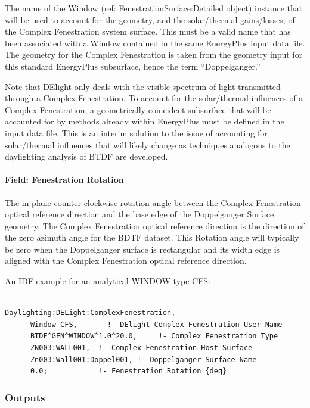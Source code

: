 The name of the Window (ref: FenestrationSurface:Detailed object) instance that will be used to account for the geometry, and the solar/thermal gains/losses, of the Complex Fenestration system surface. This must be a valid name that has been associated with a Window contained in the same EnergyPlus input data file. The geometry for the Complex Fenestration is taken from the geometry input for this standard EnergyPlus subsurface, hence the term ``Doppelganger.''

Note that DElight only deals with the visible spectrum of light transmitted through a Complex Fenestration. To account for the solar/thermal influences of a Complex Fenestration, a geometrically coincident subsurface that will be accounted for by methods already within EnergyPlus must be defined in the input data file. This is an interim solution to the issue of accounting for solar/thermal influences that will likely change as techniques analogous to the daylighting analysis of BTDF are developed.

\paragraph{Field: Fenestration Rotation}\label{field-fenestration-rotation}

The in-plane counter-clockwise rotation angle between the Complex Fenestration optical reference direction and the base edge of the Doppelganger Surface geometry. The Complex Fenestration optical reference direction is the direction of the zero azimuth angle for the BDTF dataset. This Rotation angle will typically be zero when the Doppelganger surface is rectangular and its width edge is aligned with the Complex Fenestration optical reference direction.

An IDF example for an analytical WINDOW type CFS:

\begin{lstlisting}

Daylighting:DELight:ComplexFenestration,
      Window CFS,       !- DElight Complex Fenestration User Name
      BTDF^GEN^WINDOW^1.0^20.0,     !- Complex Fenestration Type
      ZN003:WALL001,  !- Complex Fenestration Host Surface
      Zn003:Wall001:Doppel001, !- Doppelganger Surface Name
      0.0;            !- Fenestration Rotation {deg}
\end{lstlisting}

\subsubsection{Outputs}\label{outputs-006}

